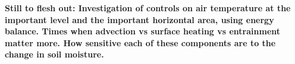 \textbf{Still to flesh out: Investigation of controls on air temperature at the important level and the important horizontal area, using energy balance.  Times when advection vs surface heating vs entrainment matter more.  How sensitive each of these components are to the change in soil moisture.}


%